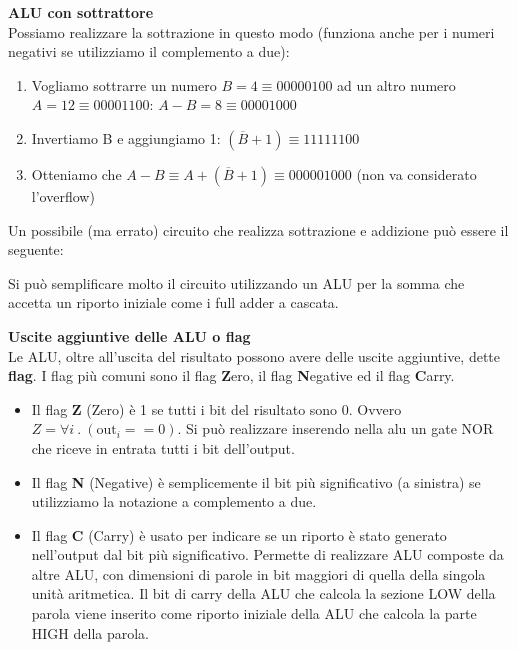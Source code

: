 
\begin{defn}
	\textbf{ALU con sottrattore} \\

	Possiamo realizzare la sottrazione in questo modo (funziona anche per i
	numeri negativi se utilizziamo il complemento a due):
	\begin{enumerate}
		\item Vogliamo sottrarre un numero $ B = 4 \equiv 00000100$ ad un altro
		numero $ A = 12 \equiv 00001100 $: $ A - B = 8 \equiv 00001000 $
		\item Invertiamo B e aggiungiamo 1: $ (\overbar{B} + 1) \equiv 11111100
		$
		\item Otteniamo che $ A - B \equiv A + (\overbar{B} + 1) \equiv
		000001000 $ (non va considerato l'overflow)
	\end{enumerate}

	Un possibile (ma errato) circuito che realizza sottrazione e addizione può
	essere il seguente:
	
	
	Si può semplificare molto il circuito utilizzando un ALU per la somma che
	accetta un riporto iniziale come i full adder a cascata.
	
\end{defn}



\begin{defn}
	\textbf{Uscite aggiuntive delle ALU o flag} \\

	Le ALU, oltre all'uscita del risultato possono avere delle uscite
	aggiuntive, dette \textbf{flag}. I flag più comuni sono il flag
	\textbf{Z}ero, il flag \textbf{N}egative ed il flag \textbf{C}arry.

	\begin{itemize}
		\item Il flag \textbf{Z} (Zero) è 1 se tutti i bit del risultato sono 0. Ovvero $
		Z = \forall i \>.\> (\text{out}_i == 0) $. Si può realizzare inserendo nella
		alu un gate NOR che riceve in entrata tutti i bit dell'output.

		\item Il flag \textbf{N} (Negative) è semplicemente il bit più significativo (a
		sinistra) se utilizziamo la notazione a complemento a due.

		\item Il flag \textbf{C} (Carry) è usato per indicare se un riporto è stato
		generato nell'output dal bit più significativo. Permette di realizzare ALU
		composte da altre ALU, con dimensioni di parole in bit maggiori di quella
		della singola unità aritmetica. Il bit di carry della ALU che calcola la
		sezione LOW della parola viene inserito come riporto iniziale della ALU che
		calcola la parte HIGH della parola.
	\end{itemize}



\end{defn}

